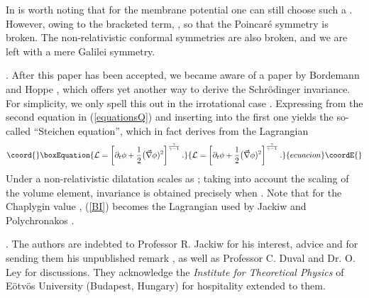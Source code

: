 \documentclass[11pt,a4paper]{article}
\def\parag{\hfil\break} %
\def\kikezd{\parag\underbar}
\begin{document}
In is worth noting that for the membrane potential \coordHE{}
one can still choose such a \myHighlight{$\chi$}\coordHE{}. However, owing to the bracketed
term, \myHighlight{$\widetilde{\chi}\neq\chi$}\coordHE{}, so that  the Poincar\'e symmetry is
broken.
The non-relativistic conformal symmetries are also broken, and
we are left with a mere Galilei symmetry.

\kikezd{Note added}. After this paper has been accepted, we became
aware of a paper by Bordemann and Hoppe \cite{BoHo2}, which offers
yet another way to derive the Schr\"odinger invariance.
For simplicity,
we only spell this out in the irrotational case \coordHE{}.
Expressing
\myHighlight{$\rho$}\coordHE{} from the second equation in (\ref{equationsQ}) and
inserting into the first one yields the
so-called ``Steichen equation'',
which in fact derives from the Lagrangian
\begin{equation}\coord{}\boxEquation{
{\cal L}=\left[\partial_t\phi+
\frac{1}{2}\big(\vec\nabla\phi)^2
\right]^{\frac{\gamma}{\gamma-1}}.
\label{BI}
}{
{\cal L}=\left[\partial_t\phi+
\frac{1}{2}\big(\vec\nabla\phi)^2
\right]^{\frac{\gamma}{\gamma-1}}.
}{ecuacion}\coordE{}\end{equation}
Under a non-relativistic
dilatation \coordHE{} scales as
\coordHE{};
taking into account
 the scaling of the volume element, %
invariance is obtained precisely when \coordHE{}.
Note that for the Chaplygin value \coordHE{},
(\ref{BI}) becomes the
Lagrangian used by Jackiw and Polychronakos
\cite{JAC}.



\goodbreak
\kikezd{Acknowledgements}.
The authors are indebted to Professor R. Jackiw for his interest, advice and
for sending them his unpublished remark \cite{JPRIV}, as well as
Professor C. Duval and Dr. O. Ley for discussions.
They acknowledge the {\it Institute for Theoretical Physics}
of E\"{o}tv\"{o}s University (Budapest, Hungary) for hospitality
extended to them.
\end{document}
